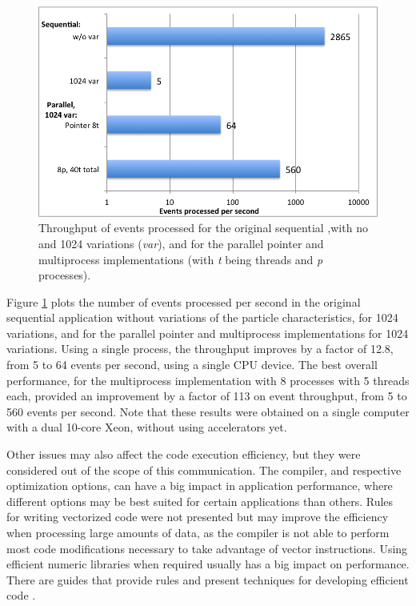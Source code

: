 \begin{figure}[!htp]
	\begin{center}
		\includegraphics[scale=0.55]{charts/events_per_sec.png}
		\caption{Throughput of events processed for the original sequential \tth,with no and 1024 variations (\textit{var}), and for the parallel pointer and multiprocess implementations (with \textit{t} being threads and \textit{p} processes).}
		\label{fig:events_sec}
	\end{center}
\end{figure}

Figure \ref{fig:events_sec} plots the number of events processed per second in the original sequential application without variations of the particle characteristics, for 1024 variations, and for the parallel pointer and multiprocess implementations for 1024 variations. Using a single process, the throughput improves by a factor of 12.8, from 5 to 64 events per second, using a single CPU device. The best overall performance, for the multiprocess implementation with 8 processes with 5 threads each, provided an improvement by a factor of 113 on event throughput, from 5 to 560 events per second. Note that these results were obtained on a single computer with a dual 10-core Xeon, without using accelerators yet.

Other issues may also affect the code execution efficiency, but they were considered out of the scope of this communication. The compiler, and respective optimization options, can have a big impact in application performance, where different options may be best suited for certain applications than others. Rules for writing vectorized code were not presented but may improve the efficiency when processing large amounts of data, as the compiler is not able to perform most code modifications necessary to take advantage of vector instructions. Using efficient numeric libraries \cite{MKL,BLAS} when required usually has a big impact on performance. There are guides that provide rules and present techniques for developing efficient code \cite{Intel:Optimization,Intel:DevOptimization,NUMA}.

